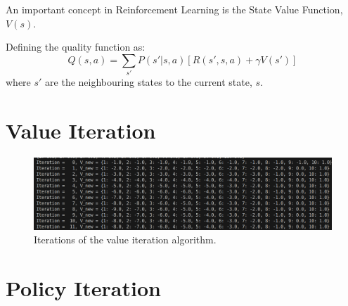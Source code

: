 \documentclass[a4paper,11pt]{article}
\begin{document}
An important concept in Reinforcement Learning is the State Value Function, $V(s)$.

Defining the quality function as:
\begin{equation} \label{eqn:quality_function_Q}
    Q(s,a) = \sum_{s'} P(s'|s,a) \left[ R(s',s,a) + \gamma V(s') \right]
\end{equation}
where $s'$ are the neighbouring states to the current state, $s$.


\section{Value Iteration}





\begin{figure}
    \includegraphics[width=\textwidth]{images/iters-of-value-iteration-1d-grid-world-code-output.png}
    \caption{Iterations of the value iteration algorithm.}
    \label{fig:iters-of-value-iteration-1d-grid-world-code-output}
\end{figure}


\section{Policy Iteration}
\end{document}
